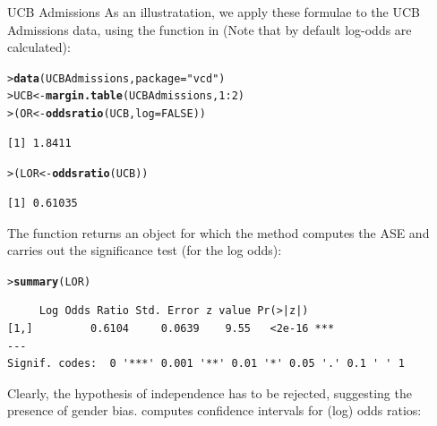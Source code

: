 \documentclass[10pt,krantz2]{krantz}\usepackage[]{graphicx}\usepackage[]{color}
\makeatletter
\newcommand{\hlnum}[1]{\textcolor[rgb]{0.686,0.059,0.569}{#1}}%
\newcommand{\hlstr}[1]{\textcolor[rgb]{0.192,0.494,0.8}{#1}}%
\newcommand{\hlopt}[1]{\textcolor[rgb]{0,0,0}{#1}}%
\newcommand{\hlstd}[1]{\textcolor[rgb]{0.345,0.345,0.345}{#1}}%
\newcommand{\hlkwb}[1]{\textcolor[rgb]{0.69,0.353,0.396}{#1}}%
\newcommand{\hlkwc}[1]{\textcolor[rgb]{0.333,0.667,0.333}{#1}}%
\newcommand{\hlkwd}[1]{\textcolor[rgb]{0.737,0.353,0.396}{\textbf{#1}}}%
\newenvironment{kframe}{%
 \def\at@end@of@kframe{}%
 \ifinner\ifhmode%
  \def\at@end@of@kframe{\end{minipage}}%
  \begin{minipage}{\columnwidth}%
 \fi\fi%
 \def\FrameCommand##1{\hskip\@totalleftmargin \hskip-\fboxsep
 \colorbox{shadecolor}{##1}\hskip-\fboxsep
     \hskip-\linewidth \hskip-\@totalleftmargin \hskip\columnwidth}%
 \MakeFramed {\advance\hsize-\width
   \@totalleftmargin\z@ \linewidth\hsize
   \@setminipage}}%
 {\par\unskip\endMakeFramed%
 \at@end@of@kframe}
\newenvironment{knitrout}{}{} %
\renewenvironment{knitrout}{\small\renewcommand{\baselinestretch}{.85}}{} %
\makeatother
\begin{document}
\begin{Example}[ucbadmissions]{UCB Admissions}
As an illustratation, we apply these formulae to the UCB Admissions
data, using the  function in  (Note that by
default log-odds are calculated): 
\begin{knitrout}
\color{fgcolor}\begin{kframe}
\begin{alltt}
\hlstd{> }\hlkwd{data}\hlstd{(UCBAdmissions,} \hlkwc{package} \hlstd{=} \hlstr{"vcd"}\hlstd{)}
\hlstd{> }\hlstd{UCB} \hlkwb{<-} \hlkwd{margin.table}\hlstd{(UCBAdmissions,} \hlnum{1}\hlopt{:}\hlnum{2}\hlstd{)}
\hlstd{> }\hlstd{(OR} \hlkwb{<-} \hlkwd{oddsratio}\hlstd{(UCB,} \hlkwc{log} \hlstd{=} \hlnum{FALSE}\hlstd{))}
\end{alltt}
\begin{verbatim}
[1] 1.8411
\end{verbatim}
\begin{alltt}
\hlstd{> }\hlstd{(LOR} \hlkwb{<-} \hlkwd{oddsratio}\hlstd{(UCB))}
\end{alltt}
\begin{verbatim}
[1] 0.61035
\end{verbatim}
\end{kframe}
\end{knitrout}
\noindent The function returns an object for which the 
method computes the ASE and carries out the significance test (for the
log odds):
\begin{knitrout}
\color{fgcolor}\begin{kframe}
\begin{alltt}
\hlstd{> }\hlkwd{summary}\hlstd{(LOR)}
\end{alltt}
\begin{verbatim}
     Log Odds Ratio Std. Error z value Pr(>|z|)    
[1,]         0.6104     0.0639    9.55   <2e-16 ***
---
Signif. codes:  0 '***' 0.001 '**' 0.01 '*' 0.05 '.' 0.1 ' ' 1
\end{verbatim}
\end{kframe}
\end{knitrout}
\noindent Clearly, the hypothesis of independence has to be rejected,
suggesting the presence of gender bias.
 computes confidence intervals for (log) odds ratios:
\begin{knitrout}
\color{fgcolor}\begin{kframe}

\end{kframe}
\end{knitrout}
\end{Example}
\end{document}
